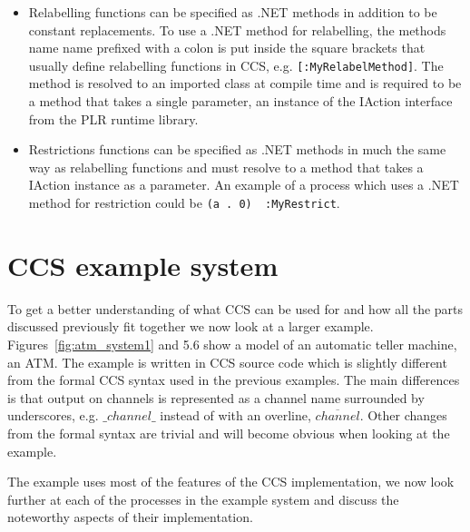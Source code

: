 \begin{itemize}
		\item Relabelling functions can be specified as .NET methods in addition 
		to be constant replacements. To use a .NET method for relabelling, the 
		methods name name prefixed with a colon is put inside the square brackets 
		that usually define relabelling functions in CCS, e.g.
		\texttt{[:MyRelabelMethod]}. The method is resolved to an imported class 
		at compile time and is required to be a method that takes a single 
		parameter, an instance of the \textsf{IAction} interface from the PLR 
		runtime library.
		
		\item Restrictions functions can be specified as .NET methods in much the 
		same way as relabelling functions and must resolve to a method that takes 
		a \textsf{IAction} instance as a parameter. An example of a process which 
		uses a .NET method for restriction could be \texttt{(a . 0) \ :MyRestrict}.

	\end{itemize}

\section{CCS example system}

  To get a better understanding of what CCS can be used for and how all the 
  parts discussed previously fit together we now look at a larger example. 
  Figures~\ref{fig:atm_system1} and 5.6 show a model %
  of an automatic teller machine, an ATM. The example is written in CCS source 
  code which is slightly different from the formal CCS syntax used in the 
  previous examples. The main differences is that output on channels is 
  represented as a channel name surrounded by underscores, e.g. $\_channel\_$ 
  instead of with an overline, $\overline{channel}$. Other changes from the 
  formal syntax are trivial and will become obvious when looking at the 
  example.
  
  The example uses most of the features of the CCS implementation, we now look 
  further at each of the processes in the example system and discuss the 
  noteworthy aspects of their implementation.
  
  
  
